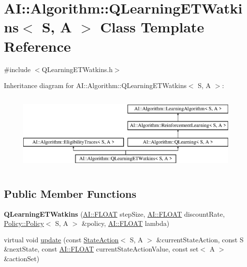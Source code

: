 \hypertarget{classAI_1_1Algorithm_1_1QLearningETWatkins}{\section{A\-I\-:\-:Algorithm\-:\-:Q\-Learning\-E\-T\-Watkins$<$ S, A $>$ Class Template Reference}
\label{classAI_1_1Algorithm_1_1QLearningETWatkins}
}


{\ttfamily \#include $<$Q\-Learning\-E\-T\-Watkins.\-h$>$}

Inheritance diagram for A\-I\-:\-:Algorithm\-:\-:Q\-Learning\-E\-T\-Watkins$<$ S, A $>$\-:\begin{figure}[H]
\begin{center}
\leavevmode
\includegraphics[height=4.000000cm]{classAI_1_1Algorithm_1_1QLearningETWatkins}
\end{center}
\end{figure}
\subsection*{Public Member Functions}
\begin{DoxyCompactItemize}
\item 
\hypertarget{classAI_1_1Algorithm_1_1QLearningETWatkins_a0304d02e8ea871414b23e6201e1f1dcc}{{\bfseries Q\-Learning\-E\-T\-Watkins} (\hyperlink{namespaceAI_a41b74884a20833db653dded3918e05c3}{A\-I\-::\-F\-L\-O\-A\-T} step\-Size, \hyperlink{namespaceAI_a41b74884a20833db653dded3918e05c3}{A\-I\-::\-F\-L\-O\-A\-T} discount\-Rate, \hyperlink{classAI_1_1Algorithm_1_1Policy_1_1Policy}{Policy\-::\-Policy}$<$ S, A $>$ \&policy, \hyperlink{namespaceAI_a41b74884a20833db653dded3918e05c3}{A\-I\-::\-F\-L\-O\-A\-T} lambda)}\label{classAI_1_1Algorithm_1_1QLearningETWatkins_a0304d02e8ea871414b23e6201e1f1dcc}

\item 
virtual void \hyperlink{classAI_1_1Algorithm_1_1QLearningETWatkins_a5cbad8c16dfbf6fe72c85fe5c8c4e273}{update} (const \hyperlink{classAI_1_1StateAction}{State\-Action}$<$ S, A $>$ \&current\-State\-Action, const S \&next\-State, const \hyperlink{namespaceAI_a41b74884a20833db653dded3918e05c3}{A\-I\-::\-F\-L\-O\-A\-T} current\-State\-Action\-Value, const set$<$ A $>$ \&action\-Set)
\end{DoxyCompactItemize}

